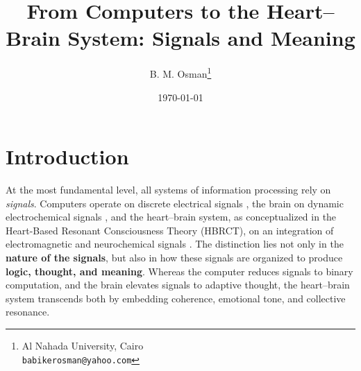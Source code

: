 \documentclass[12pt]{article}
\title{\textcolor{titleColor}{\textbf{\Huge \textbf{ From Computers to the Heart--Brain System: Signals and Meaning }}}}
\author{B. M. Osman\thanks{Al Nahada University, Cairo \\ \texttt{babikerosman@yahoo.com}}}
\date{\today}
\begin{document}
\maketitle

\section*{Introduction}
At the most fundamental level, all systems of information processing rely on \textit{signals}. 
Computers operate on discrete electrical signals \citep{vonNeumann1945, turing1937}, 
the brain on dynamic electrochemical signals \citep{kandel2000principles, dayan2001theoretical}, 
and the heart--brain system, as conceptualized in the Heart-Based Resonant Consciousness Theory (HBRCT), 
on an integration of electromagnetic and neurochemical signals \citep{mcCraty2003heart, bradley2009electrophysiology}. 
The distinction lies not only in the \textbf{nature of the signals}, but also in how these signals 
are organized to produce \textbf{logic, thought, and meaning}. 
Whereas the computer reduces signals to binary computation, and the brain elevates signals to adaptive thought, 
the heart--brain system transcends both by embedding coherence, emotional tone, and collective resonance. 


\begin{center}
\end{center}
\end{document}
